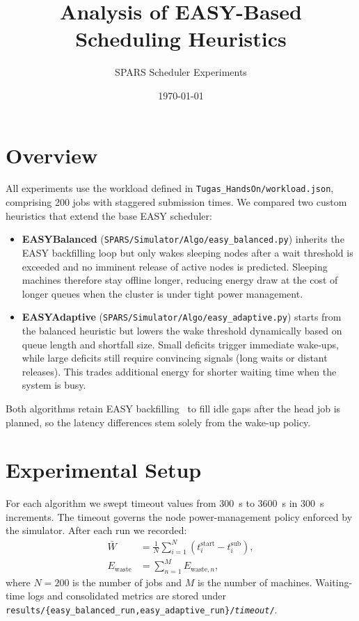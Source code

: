 \documentclass[11pt]{article}
\title{Analysis of EASY-Based Scheduling Heuristics}
\author{SPARS Scheduler Experiments}
\date{\today}
\begin{document}
\maketitle

\section{Overview}
All experiments use the workload defined in \texttt{Tugas\_HandsOn/workload.json}, comprising 200 jobs with staggered submission times. We compared two custom heuristics that extend the base EASY scheduler:
\begin{itemize}
  \item \textbf{EASYBalanced} (\texttt{SPARS/Simulator/Algo/easy\_balanced.py}) inherits the EASY backfilling loop but only wakes sleeping nodes after a wait threshold is exceeded and no imminent release of active nodes is predicted. Sleeping machines therefore stay offline longer, reducing energy draw at the cost of longer queues when the cluster is under tight power management.
  \item \textbf{EASYAdaptive} (\texttt{SPARS/Simulator/Algo/easy\_adaptive.py}) starts from the balanced heuristic but lowers the wake threshold dynamically based on queue length and shortfall size. Small deficits trigger immediate wake-ups, while large deficits still require convincing signals (long waits or distant releases). This trades additional energy for shorter waiting time when the system is busy.
\end{itemize}
Both algorithms retain EASY backfilling~\cite{easy} to fill idle gaps after the head job is planned, so the latency differences stem solely from the wake-up policy.

\section{Experimental Setup}
For each algorithm we swept timeout values from \SI{300}{\second} to \SI{3600}{\second} in \SI{300}{\second} increments. The timeout governs the node power-management policy enforced by the simulator. After each run we recorded:
\begin{align}
  \bar{W} &= \frac{1}{N} \sum_{i=1}^{N} \left( t^{\text{start}}_{i} - t^{\text{sub}}_{i} \right), \\
  E_{\mathrm{waste}} &= \sum_{n=1}^{M} E_{\mathrm{waste},n},
\end{align}
where $N=200$ is the number of jobs and $M$ is the number of machines. Waiting-time logs and consolidated metrics are stored under \texttt{results/\{easy\_balanced\_run,easy\_adaptive\_run\}/\textit{timeout}/}.
\end{document}
